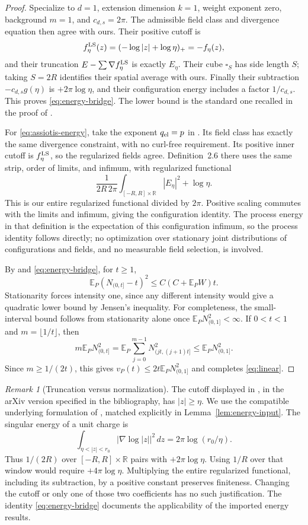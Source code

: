\documentclass[11pt,reqno]{amsart}
\numberwithin{equation}{section}
\theoremstyle{definition}
\theoremstyle{remark}
\newtheorem{remark}[theorem]{Remark}
\newcommand{\R}{\mathbb R}
\newcommand{\E}{\mathbb E}
\newcommand{\1}{\mathbf 1}
\newcommand{\dd}{\,d}
\begin{document}
\begin{proof}
Specialize \cite[Sections~2.6.4--2.7.4]{LS} to $d=1$, extension
dimension $k=1$, weight exponent zero, background $m=1$, and
$c_{d,s}=2\pi$. The admissible field class and divergence equation
then agree with ours. Their positive cutoff is
\[
f_\eta^{\rm LS}(z)=(-\log|z|+\log\eta)_+=-f_\eta(z),
\]
and their truncation $E-\sum\nabla f_\eta^{\rm LS}$ is exactly
$E_\eta$. Their cube $\square_S$ has side length $S$; taking $S=2R$
identifies their spatial average with ours. Finally their subtraction
$-c_{d,s}g(\eta)$ is $+2\pi\log\eta$, and their configuration energy
includes a factor $1/c_{d,s}$. This proves \eqref{eq:energy-bridge}.
The lower bound is the standard one recalled in the proof of
\cite[Lemma~3.9]{LS}.

For \eqref{eq:assiotis-energy}, take the exponent $q_{\rm el}=p$ in
\cite[Definition~2.5]{Assiotis}. Its field class has exactly the same
divergence constraint, with no curl-free requirement. Its positive
inner cutoff is $f_\eta^{\rm LS}$, so the regularized fields agree.
Definition~2.6 there uses the same strip, order of limits, and infimum,
with regularized functional
\[
\frac1{2R\,2\pi}\int_{[-R,R]\times\R}|E_\eta|^2
+\log\eta.
\]
This is our entire regularized functional divided by $2\pi$.
Positive scaling commutes with the limits and infimum, giving the
configuration identity. The process energy in that definition is the
expectation of this configuration infimum, so the process identity
follows directly; no optimization over stationary joint distributions of configurations and
fields, and no measurable field selection, is involved.

By \cite[Lemma~3.2]{LS} and \eqref{eq:energy-bridge}, for $t\ge1$,
\[
\E_P(N_{(0,t]}-t)^2\le C(C+\E_PW)t.
\]
Stationarity forces intensity one, since any different intensity would
give a quadratic lower bound by Jensen's inequality.
For completeness, the small-interval bound follows from stationarity
alone once $\E_PN_{(0,1]}^2<\infty$. If $0<t<1$ and
$m=\lfloor1/t\rfloor$, then
\[
m\E_PN_{(0,t]}^2
=\E_P\sum_{j=0}^{m-1}N_{(jt,(j+1)t]}^2
\le\E_PN_{(0,1]}^2.
\]
Since $m\ge1/(2t)$, this gives
$v_P(t)\le2t\E_PN_{(0,1]}^2$ and completes \eqref{eq:linear}.
\end{proof}

\begin{remark}[Truncation versus normalization]\label{rem:cutoff}
The cutoff displayed in \cite[Definition~2.20]{DHLM}, in the
arXiv version specified in the bibliography, has $|z|\ge\eta$.
We use the compatible underlying formulation of \cite{LS}, matched
explicitly in Lemma~\ref{lem:energy-input}.
The singular energy of a unit charge is
\[
\int_{\eta<|z|<r_0}|\nabla\log|z||^2\dd z
=2\pi\log(r_0/\eta).
\]
Thus $1/(2R)$ over $[-R,R]\times\R$ pairs with $+2\pi\log\eta$.
Using $1/R$ over that window would require $+4\pi\log\eta$.
Multiplying the entire regularized functional, including its
subtraction, by a positive constant preserves finiteness. Changing
the cutoff or only one of those two coefficients has no such
justification. The identity \eqref{eq:energy-bridge} documents the
applicability of the imported energy results.
\end{remark}
\end{document}
